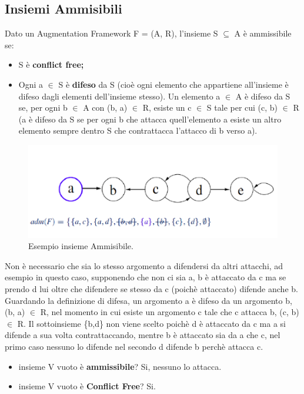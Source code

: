 \subsection{Insiemi Ammisibili}
Dato un Augmentation Framework F = (A, R), l’insieme S $\subseteq$ A è ammissibile se:
\begin{itemize}
    \item S è \textbf{conflict free;}
    \item Ogni a $\in$ S è \textbf{difeso} da S (cioè ogni elemento che appartiene all’insieme è difeso dagli elementi dell’insieme stesso). Un elemento a $\in$ A è difeso da S se, per ogni b $\in$ A con (b, a) $\in$ R, esiste un c $\in$ S tale per cui (c, b) $\in$ R (a è difeso da S se per ogni b che attacca quell’elemento a esiste un altro elemento sempre dentro S che contrattacca l’attacco di b verso a).
\end{itemize}
\begin{figure}[htp]
	\centering
    \includegraphics[width=12cm, keepaspectratio]{img/Cap6/ammissibile.png}
    \caption{Esempio insieme Ammisibile.}
\end{figure}
Non è necessario che sia lo stesso argomento a difendersi da altri attacchi, ad esempio in questo caso, supponendo che non ci sia a, b è attaccato da c ma se prendo d lui oltre che difendere se stesso da c (poichè attaccato) difende anche b. Guardando la definizione di difesa, un argomento a è difeso da un argomento b, (b, a) $\in$ R, nel momento in cui esiste un argomento c tale che c attacca b, (c, b) $\in$ R. Il sottoinsieme \{b,d\} non viene scelto poichè d è attaccato da c ma a si difende a sua volta contrattaccando, mentre b è attaccato sia da a che c, nel primo caso nessuno lo difende nel secondo d difende b perchè attacca c.
\begin{itemize}
    \item insieme V vuoto è \textbf{ammissibile}? Si, nessuno lo attacca.
    \item insieme V vuoto è \textbf{Conflict Free}? Si.
\end{itemize}

